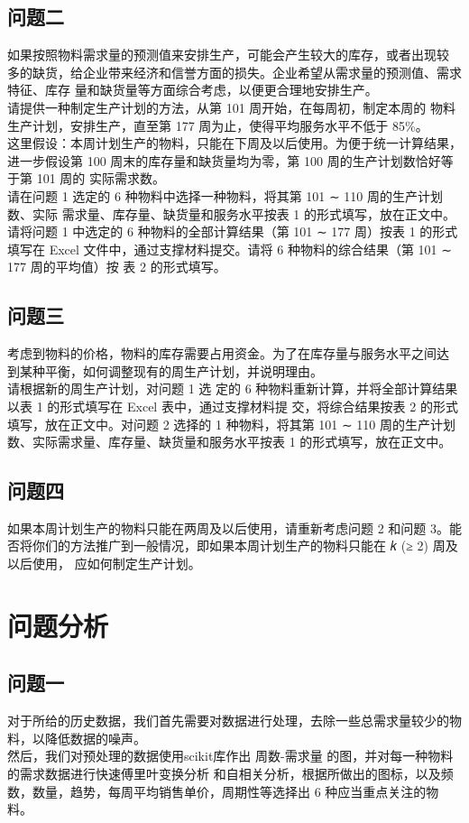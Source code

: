 \documentclass{cumcmthesis}
\begin{document}
        \subsection{问题二}
        如果按照物料需求量的预测值来安排生产，可能会产生较大的库存，或者出现较
多的缺货，给企业带来经济和信誉方面的损失。企业希望从需求量的预测值、需求特征、库存
量和缺货量等方面综合考虑，以便更合理地安排生产。\\
    请提供一种制定生产计划的方法，从第 101 周开始，在每周初，制定本周的
物料生产计划，安排生产，直至第 177 周为止，使得平均服务水平不低于 85\%。\\    这里假设：本周计划生产的物料，只能在下周及以后使用。为便于统一计算结果，
进一步假设第 100 周末的库存量和缺货量均为零，第 100 周的生产计划数恰好等于第 101 周的
实际需求数。\\
请在问题 1 选定的 6 种物料中选择一种物料，将其第 101 ∼ 110 周的生产计划数、实际
需求量、库存量、缺货量和服务水平按表 1 的形式填写，放在正文中。\\
    请将问题 1 中选定的 6 种物料的全部计算结果（第 101 ∼ 177 周）按表 1 的形式填写在
Excel 文件中，通过支撑材料提交。请将 6 种物料的综合结果（第 101 ∼ 177 周的平均值）按
表 2 的形式填写。
        \subsection{问题三}
        考虑到物料的价格，物料的库存需要占用资金。为了在库存量与服务水平之间达
到某种平衡，如何调整现有的周生产计划，并说明理由。\\    请根据新的周生产计划，对问题 1 选
定的 6 种物料重新计算，并将全部计算结果以表 1 的形式填写在 Excel 表中，通过支撑材料提
交，将综合结果按表 2 的形式填写，放在正文中。对问题 2 选择的 1 种物料，将其第 101 ∼ 110
周的生产计划数、实际需求量、库存量、缺货量和服务水平按表 1 的形式填写，放在正文中。

        \subsection{问题四}
        如果本周计划生产的物料只能在两周及以后使用，请重新考虑问题 2 和问题 3。能
否将你们的方法推广到一般情况，即如果本周计划生产的物料只能在 𝑘 (≥ 2) 周及以后使用，
应如何制定生产计划。
        \section{问题分析}
        \subsection{问题一}
        对于所给的历史数据，我们首先需要对数据进行处理，去除一些总需求量较少的物料，以降低数据的噪声。\\
        然后，我们对预处理的数据使用scikit库作出 周数-需求量 的图，并对每一种物料的需求数据进行快速傅里叶变换分析
        和自相关分析，根据所做出的图标，以及频数，数量，趋势，每周平均销售单价，周期性等选择出 6 种应当重点关注的物料。\\
\end{document}
